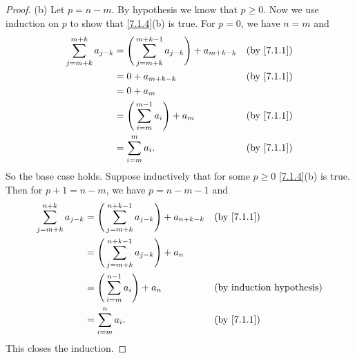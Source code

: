 \begin{proof}{(b)}
  Let \(p = n - m\).
  By hypothesis we know that \(p \geq 0\).
  Now we use induction on \(p\) to show that \cref{7.1.4}(b) is true.
  For \(p = 0\), we have \(n = m\) and
  \begin{align*}
    \sum_{j = m + k}^{m + k} a_{j - k} & = \Bigg(\sum_{j = m + k}^{m + k - 1} a_{j - k}\Bigg) + a_{m + k - k} &  & \by{7.1.1} \\
                                       & = 0 + a_{m + k - k}                                                  &  & \by{7.1.1} \\
                                       & = 0 + a_m                                                                            \\
                                       & = \Bigg(\sum_{i = m}^{m - 1} a_i\Bigg) + a_m                         &  & \by{7.1.1} \\
                                       & = \sum_{i = m}^m a_i.                                                &  & \by{7.1.1}
  \end{align*}
  So the base case holds.
  Suppose inductively that for some \(p \geq 0\) \cref{7.1.4}(b) is true.
  Then for \(p + 1 = n - m\), we have \(p = n - m - 1\) and
  \begin{align*}
    \sum_{j = m + k}^{n + k} a_{j - k} & = \Bigg(\sum_{j = m + k}^{n + k - 1} a_{j - k}\Bigg) + a_{n + k - k} &  & \by{7.1.1} \\
                                       & = \Bigg(\sum_{j = m + k}^{n + k - 1} a_{j - k}\Bigg) + a_n                           \\
                                       & = \Bigg(\sum_{i = m}^{n - 1} a_i\Bigg) + a_n                         &  & \byIH      \\
                                       & = \sum_{i = m}^n a_i.                                                &  & \by{7.1.1}
  \end{align*}
  This closes the induction.
\end{proof}

